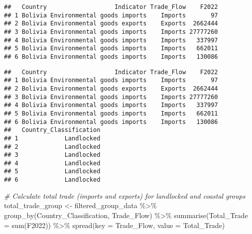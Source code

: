 \documentclass[
]{article}
\newenvironment{Shaded}{\begin{snugshade}}{\end{snugshade}}
\newcommand{\AttributeTok}[1]{\textcolor[rgb]{0.77,0.63,0.00}{#1}}
\newcommand{\CommentTok}[1]{\textcolor[rgb]{0.56,0.35,0.01}{\textit{#1}}}
\newcommand{\FunctionTok}[1]{\textcolor[rgb]{0.00,0.00,0.00}{#1}}
\newcommand{\NormalTok}[1]{#1}
\newcommand{\OtherTok}[1]{\textcolor[rgb]{0.56,0.35,0.01}{#1}}
\newcommand{\SpecialCharTok}[1]{\textcolor[rgb]{0.00,0.00,0.00}{#1}}
\newcommand{\StringTok}[1]{\textcolor[rgb]{0.31,0.60,0.02}{#1}}
\begin{document}
\begin{verbatim}
##   Country                   Indicator Trade_Flow    F2022
## 1 Bolivia Environmental goods imports    Imports       97
## 2 Bolivia Environmental goods exports    Exports  2662444
## 3 Bolivia Environmental goods imports    Imports 27777260
## 4 Bolivia Environmental goods imports    Imports   337997
## 5 Bolivia Environmental goods imports    Imports   662011
## 6 Bolivia Environmental goods imports    Imports   130086
\end{verbatim}

\begin{Shaded}
\end{Shaded}

\begin{verbatim}
##   Country                   Indicator Trade_Flow    F2022
## 1 Bolivia Environmental goods imports    Imports       97
## 2 Bolivia Environmental goods exports    Exports  2662444
## 3 Bolivia Environmental goods imports    Imports 27777260
## 4 Bolivia Environmental goods imports    Imports   337997
## 5 Bolivia Environmental goods imports    Imports   662011
## 6 Bolivia Environmental goods imports    Imports   130086
##   Country_Classification
## 1             Landlocked
## 2             Landlocked
## 3             Landlocked
## 4             Landlocked
## 5             Landlocked
## 6             Landlocked
\end{verbatim}

\begin{Shaded}
\begin{Highlighting}[]
\CommentTok{\# Calculate total trade (imports and exports) for landlocked and coastal groups}
\NormalTok{total\_trade\_group }\OtherTok{\textless{}{-}}\NormalTok{ filtered\_group\_data }\SpecialCharTok{\%\textgreater{}\%}
  \FunctionTok{group\_by}\NormalTok{(Country\_Classification, Trade\_Flow) }\SpecialCharTok{\%\textgreater{}\%}
  \FunctionTok{summarise}\NormalTok{(}\AttributeTok{Total\_Trade =} \FunctionTok{sum}\NormalTok{(F2022)) }\SpecialCharTok{\%\textgreater{}\%}
  \FunctionTok{spread}\NormalTok{(}\AttributeTok{key =}\NormalTok{ Trade\_Flow, }\AttributeTok{value =}\NormalTok{ Total\_Trade)}
\end{Highlighting}
\end{Shaded}
\end{document}
